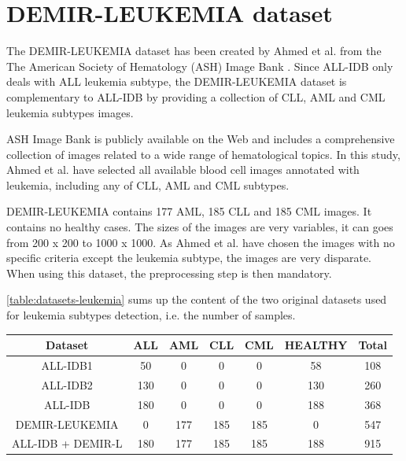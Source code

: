 \documentclass[11pt, openany]{report}
\theoremstyle{plain}
\theoremstyle{definition}
\theoremstyle{remark}
\begin{document}
\newpage
\section{DEMIR-LEUKEMIA dataset} \label{sec:demir-leukemia}
The DEMIR-LEUKEMIA dataset has been created by Ahmed et al. \cite{leukemia} from the The American Society of Hematology (ASH) Image Bank \cite{ASH}. Since ALL-IDB only deals with ALL leukemia subtype, the DEMIR-LEUKEMIA dataset is complementary to ALL-IDB by providing a collection of CLL, AML and CML leukemia subtypes images.  

ASH Image Bank is publicly available on the Web and includes a comprehensive collection of
images related to a wide range of hematological topics. In this study, Ahmed et al. have selected all available blood cell images annotated with leukemia, including any of CLL, AML and CML subtypes. 

DEMIR-LEUKEMIA contains 177 AML, 185 CLL and 185 CML images. It contains no healthy cases. The sizes of the images are very variables, it can goes from 200 x 200 to 1000 x 1000. As Ahmed et al. have chosen the images with no specific criteria except the leukemia subtype, the images are very disparate. When using this dataset, the preprocessing step is then mandatory. 

\autoref{table:datasets-leukemia} sums up the content of the two original datasets used for leukemia subtypes detection, i.e. the number of samples. 

\begin{center}
    \begin{tabular}{|c|c|c|c|c|c|c|}
      \hline
      \textbf{Dataset} & \textbf{ALL} & \textbf{AML} & \textbf{CLL} & \textbf{CML} & \textbf{HEALTHY} & \textbf{Total}\\
      \hline
      ALL-IDB1 & 50 & 0 & 0 & 0 & 58 & 108  \\
      \hline
      ALL-IDB2 & 130 & 0 & 0 & 0 & 130 & 260  \\
      \hline
      ALL-IDB & 180 & 0 & 0 & 0 & 188 & 368  \\
      \hline
      DEMIR-LEUKEMIA & 0 & 177 & 185 & 185 & 0 & 547  \\
      \hline
      \hline
      ALL-IDB + DEMIR-L & 180 & 177 & 185 & 185 & 188 & 915 \\ 
      \hline
    \end{tabular}
    \label{table:datasets-leukemia}
\end{center} 
\end{document}
